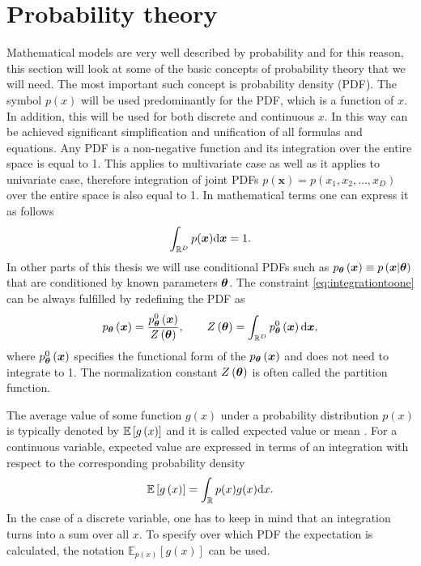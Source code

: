 \section{Probability theory}
Mathematical models are very well described by probability and for this reason, this section will look at some of the basic concepts of probability theory that we will need. The most important such concept is probability density (PDF). The symbol $p(x)$ will be used predominantly for the PDF, which is a function of $x$.  In addition, this will be used for both discrete and continuous $x$. In this way can be achieved significant simplification and unification of all formulas and equations. Any PDF is a non-negative function and its integration over the entire space is equal to 1. This applies to multivariate case as well as it applies to univariate case, therefore integration of joint PDFs $p(\boldsymbol{x}) = p\left(x_1, x_2, \dots, x_D\right)$ over the entire space is also equal to 1. In mathematical terms one can express it as follows
\begin{equation}\label{eq:integrationtoone}
\int_{\mathbb{R}^D}p(\boldsymbol{x})\mathrm{d}{\boldsymbol{x}} = 1.
\end{equation}
In other parts of this thesis we will use conditional PDFs such as $p_{\boldsymbol{\theta}}\left(\boldsymbol{x}\right) \equiv p\left(\boldsymbol{x}|\boldsymbol{\theta}\right)  $ that are conditioned by known parameters $\boldsymbol{\theta}$. The constraint \eqref{eq:integrationtoone} can be always fulfilled by redefining the PDF as
\begin{equation}\label{eq:partitionfunction}
    p_{\boldsymbol{\theta}}\left(\boldsymbol{x}\right) = \frac{p_{\boldsymbol{\theta}}^{0}\left(\boldsymbol{x}\right)}{Z\left(\boldsymbol{\theta}\right)}, \qquad Z\left(\boldsymbol{\theta}\right) = \int_{\mathbb{R}^D} p_{\boldsymbol{\theta}}^0\left(\boldsymbol{x}\right)\mathrm{d}{\boldsymbol{x}}, 
\end{equation}
where $p_{\boldsymbol{\theta}}^{0}\left(\boldsymbol{x}\right)$ specifies the functional form of the $p_{\boldsymbol{\theta}}\left(\boldsymbol{x}\right)$ and does not need to integrate to 1. The normalization constant $Z\left(\boldsymbol{\theta}\right)$ is often called the partition function.

The average value of some function $g(x)$ under a probability distribution $p(x)$ is typically denoted by $\mathbb{E}\left[ g\left(x\right) \right]$ and it is called expected value or mean \cite{bishop}. For a continuous variable, expected value are expressed in terms of an integration with respect to the corresponding probability density
\begin{equation}
	\mathbb{E}\left[ g\left(x\right) \right] = \int_{\mathbb{R}} p(x)g(x)\mathrm{d}{x}.
\end{equation} 
In the case of a discrete variable, one has to keep in mind that an integration turns into a sum over all $x$. To specify over which PDF the expectation is calculated, the notation $\mathbb{E}_{p(x)}\left[g\left(x\right)\right]$ can be used.


